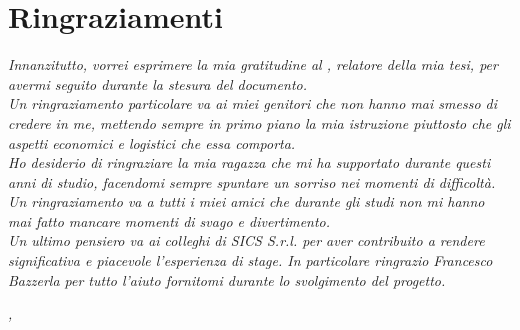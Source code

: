 
\cleardoublepage
{}
{}

\bigskip

\begingroup
\let\clearpage\relax
\let\cleardoublepage\relax
\let\cleardoublepage\relax

\chapter*{Ringraziamenti}

\noindent \textit{Innanzitutto, vorrei esprimere la mia gratitudine al \profTitle  \myProf, relatore della mia tesi, per avermi seguito durante la stesura del documento.}\\

\noindent \textit{Un ringraziamento particolare va ai miei genitori che non hanno mai smesso di credere in me, mettendo sempre in primo piano la mia istruzione piuttosto che gli aspetti economici e logistici che essa comporta.}\\

\noindent \textit{Ho desiderio di ringraziare la mia ragazza che mi ha supportato durante questi anni di studio, facendomi sempre spuntare un sorriso nei momenti di difficoltà.}\\

\noindent \textit{Un ringraziamento va a tutti i miei amici che durante gli studi non mi hanno mai fatto mancare momenti di svago e divertimento.}\\

\noindent \textit{Un ultimo pensiero va ai colleghi di SICS S.r.l. per aver contribuito a rendere significativa e piacevole l'esperienza di stage. In particolare ringrazio Francesco Bazzerla per tutto l'aiuto fornitomi durante lo svolgimento del progetto.}\\
\bigskip

\noindent\textit{\myLocation, \myTime}
\hfill \myName

\endgroup

